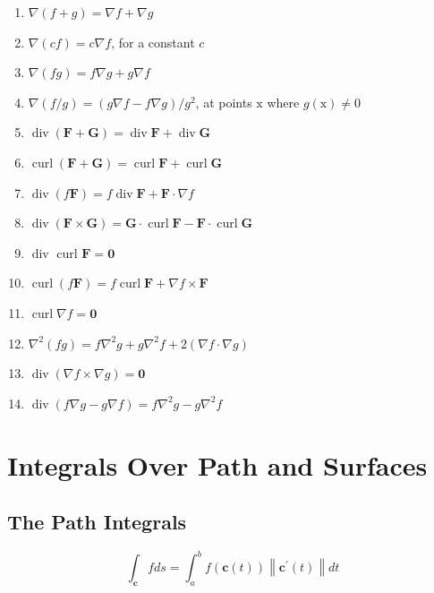 \documentclass[11pt]{article}
\begin{document}
\begin{enumerate}
    \item $\nabla(f+g)=\nabla f+\nabla g$
    \item $\nabla(c f)=c \nabla f$, for a constant $c$
    \item $\nabla(f g)=f \nabla g+g \nabla f$
    \item $\nabla(f / g)=(g \nabla f-f \nabla g) / g^{2}$, at points $\mathrm{x}$ where $g(\mathrm{x}) \neq 0$
    \item $\operatorname{div}(\mathbf{F}+\mathbf{G})=\operatorname{div} \mathbf{F}+\operatorname{div} \mathbf{G}$
    \item $\operatorname{curl}(\mathbf{F}+\mathbf{G})=\operatorname{curl} \mathbf{F}+\operatorname{curl} \mathbf{G}$
    \item $\operatorname{div}(f \mathbf{F})=f \operatorname{div} \mathbf{F}+\mathbf{F} \cdot \nabla f$
    \item $\operatorname{div}(\mathbf{F} \times \mathbf{G})=\mathbf{G} \cdot \operatorname{curl} \mathbf{F}-\mathbf{F} \cdot \operatorname{curl} \mathbf{G}$
    \item {\color{red} $\operatorname{div}$ curl $\mathbf{F}=\mathbf{0}$}
    \item $\operatorname{curl}(f \mathbf{F})=f \operatorname{curl} \mathbf{F}+\nabla f \times \mathbf{F}$
    \item {\color{red}$\operatorname{curl} \nabla f=\mathbf{0}$}
    \item $\nabla^{2}(f g)=f \nabla^{2} g+g \nabla^{2} f+2(\nabla f \cdot \nabla g)$
    \item $\operatorname{div}(\nabla f \times \nabla g)=\mathbf{0}$
    \item $\operatorname{div}(f \nabla g-g \nabla f)=f \nabla^{2} g-g \nabla^{2} f$
\end{enumerate}

\newpage

\section{Integrals Over Path and Surfaces}
\subsection{The Path Integrals}
\[\int_{\mathbf{c}} f d s= \int_{a}^{b} f(\mathbf{c}(t))\left\|\mathbf{c}^{\prime}(t)\right\| d t\]
\end{document}
